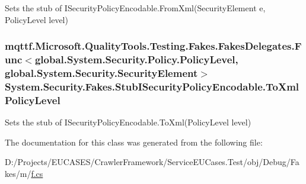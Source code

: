 Sets the stub of I\-Security\-Policy\-Encodable.\-From\-Xml(\-Security\-Element e, Policy\-Level level)

\hypertarget{class_system_1_1_security_1_1_fakes_1_1_stub_i_security_policy_encodable_a65f71cfea7d80d838ff2425d73ca8ee1}{
\subsubsection[{To\-Xml\-Policy\-Level}]{\setlength{\rightskip}{0pt plus 5cm}mqttf.\-Microsoft.\-Quality\-Tools.\-Testing.\-Fakes.\-Fakes\-Delegates.\-Func$<$global.\-System.\-Security.\-Policy.\-Policy\-Level, global.\-System.\-Security.\-Security\-Element$>$ System.\-Security.\-Fakes.\-Stub\-I\-Security\-Policy\-Encodable.\-To\-Xml\-Policy\-Level}}\label{class_system_1_1_security_1_1_fakes_1_1_stub_i_security_policy_encodable_a65f71cfea7d80d838ff2425d73ca8ee1}


Sets the stub of I\-Security\-Policy\-Encodable.\-To\-Xml(\-Policy\-Level level)



The documentation for this class was generated from the following file\-:\begin{DoxyCompactItemize}
\item 
D\-:/\-Projects/\-E\-U\-C\-A\-S\-E\-S/\-Crawler\-Framework/\-Service\-E\-U\-Cases.\-Test/obj/\-Debug/\-Fakes/m/\hyperlink{m_2f_8cs}{f.\-cs}\end{DoxyCompactItemize}
